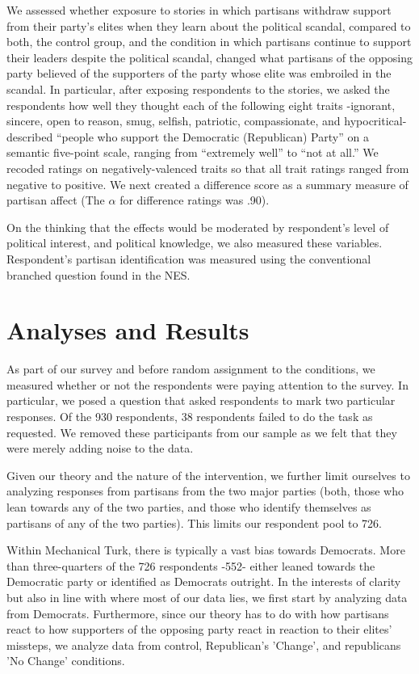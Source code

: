 \documentclass[12pt]{article}
\begin{document}
We assessed whether exposure to stories in which partisans withdraw support from
their party's elites when they learn about the political scandal, compared to
both, the control group, and the condition in which partisans continue to
support their leaders despite the political scandal, changed what partisans of
the opposing party believed of the supporters of the party whose elite was
embroiled in the scandal. In particular, after exposing respondents to the
stories, we asked the respondents how well they thought each of the following
eight traits -ignorant, sincere, open to reason, smug, selfish, patriotic,
compassionate, and hypocritical- described ``people who support the Democratic
(Republican) Party'' on a semantic five-point scale, ranging from ``extremely
well'' to ``not at all.'' We recoded ratings on negatively-valenced traits so
that all trait ratings ranged from negative to positive. We next created
a difference score as a summary measure of partisan affect (The $\alpha$ for
difference ratings was .90).

On the thinking that the effects would be moderated by respondent's level of
political interest, and political knowledge, we also measured these variables. 
Respondent's partisan identification was measured using the conventional
branched question found in the NES.

\section*{Analyses and Results}

As part of our survey and before random assignment to the conditions, we
measured whether or not the respondents were paying attention to the survey. In particular, we posed a question that asked respondents to mark two particular responses. Of the 930 respondents, 38 respondents failed to do the task as requested. We removed these participants from our sample as we felt that they were merely adding noise to the data.

Given our theory and the nature of the intervention, we further limit ourselves
to analyzing responses from partisans from the two major parties (both, those who lean towards any of the two parties, and those who identify themselves as partisans of any of the two parties). This limits our respondent pool to 726.

Within Mechanical Turk, there is typically a vast bias towards Democrats. More
than three-quarters of the 726 respondents -552- either leaned towards the
Democratic party or identified as Democrats outright. In the interests of
clarity but also in line with where most of our data lies, we first start by
analyzing data from Democrats. Furthermore, since our theory has to do with how
partisans react to how supporters of the opposing party react in reaction to
their elites' missteps, we analyze data from control, Republican's 'Change',
and republicans 'No Change' conditions.
\end{document}
